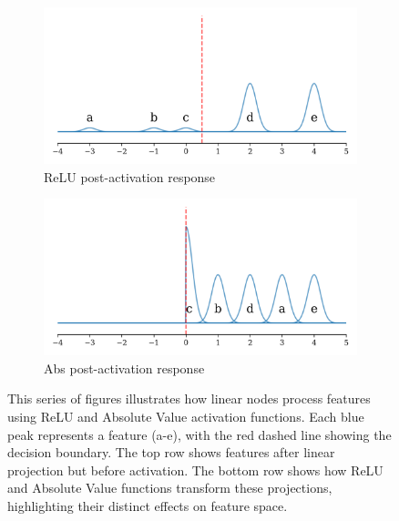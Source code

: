 \begin{figure}[ht]
    \begin{subfigure}[b]{0.49\textwidth}
        \centering
        \includegraphics[width=\textwidth]{images/activation_demo_relu_post}
        \caption{ReLU post-activation response}
        \label{fig:relu_post}
    \end{subfigure}
    \hfill
    \begin{subfigure}[b]{0.49\textwidth}
        \centering
        \includegraphics[width=\textwidth]{images/activation_demo_abs_post}
        \caption{Abs post-activation response}
        \label{fig:abs_post}
    \end{subfigure}

    \caption{This series of figures illustrates how linear nodes process features using ReLU and Absolute Value activation functions. Each blue peak represents a feature (a-e), with the red dashed line showing the decision boundary. The top row shows features after linear projection but before activation. The bottom row shows how ReLU and Absolute Value functions transform these projections, highlighting their distinct effects on feature space.}
    \label{fig:activation_demo}
\end{figure}

